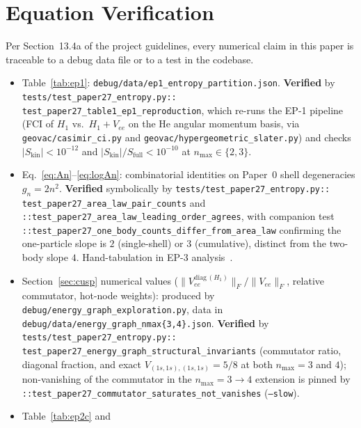 \documentclass[twocolumn,pra,amsmath,amssymb,superscriptaddress]{revtex4-2}
\begin{document}
\section*{Equation Verification}

Per Section~13.4a of the project guidelines, every numerical
claim in this paper is traceable to a debug data file or to a
test in the codebase.

\begin{itemize}
  \item Table~\ref{tab:ep1}: \texttt{debug/data/ep1\_entropy\_partition.json}.
    \textbf{Verified} by
    \texttt{tests/test\_paper27\_entropy.py::\allowbreak
    test\_paper27\_table1\_ep1\_reproduction}, which re-runs the
    EP-1 pipeline (FCI of $H_1$ vs.\ $H_1+V_{ee}$ on the He
    angular momentum basis, via \texttt{geovac/casimir\_ci.py}
    and \texttt{geovac/hypergeometric\_slater.py}) and checks
    $|S_{\mathrm{kin}}|<10^{-12}$ and
    $|S_{\mathrm{kin}}|/S_{\mathrm{full}}<10^{-10}$ at
    $n_{\max}\in\{2,3\}$.
  \item Eq.~\eqref{eq:An}--\eqref{eq:logAn}: combinatorial
    identities on Paper~0 shell degeneracies $g_n=2n^{2}$.
    \textbf{Verified} symbolically by
    \texttt{tests/test\_paper27\_entropy.py::\allowbreak
    test\_paper27\_area\_law\_pair\_counts} and
    \texttt{::test\_paper27\_area\_law\_leading\_order\_agrees},
    with companion test
    \texttt{::test\_paper27\_one\_body\_counts\_differ\_from\_area\_law}
    confirming the one-particle slope is $2$ (single-shell) or
    $3$ (cumulative), distinct from the two-body slope $4$.
    Hand-tabulation in EP-3 analysis~\cite{EP3_data}.
  \item Section~\ref{sec:cusp} numerical values
    ($\lVert V_{ee}^{\mathrm{diag}\,(H_1)}\rVert_F/\lVert V_{ee}\rVert_F$,
    relative commutator, hot-node weights): produced by
    \texttt{debug/energy\_graph\_exploration.py}, data in
    \texttt{debug/data/energy\_graph\_nmax\{3,4\}.json}.
    \textbf{Verified} by
    \texttt{tests/test\_paper27\_entropy.py::\allowbreak
    test\_paper27\_energy\_graph\_structural\_invariants}
    (commutator ratio, diagonal fraction, and exact
    $V_{(1s,1s),(1s,1s)} = 5/8$ at both $n_{\max}=3$ and $4$);
    non-vanishing of the commutator in the $n_{\max}=3 \to 4$
    extension is pinned by
    \texttt{::test\_paper27\_commutator\_saturates\_not\_vanishes}
    (\texttt{--slow}).
  \item Table~\ref{tab:ep2c} and

\end{itemize}
\end{document}
